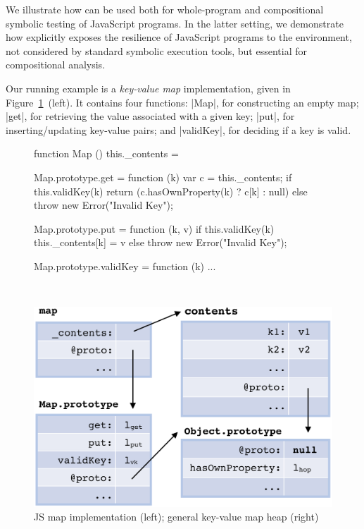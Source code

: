 
We illustrate how \cosette can be used both for whole-program and compositional symbolic testing of JavaScript programs. In the latter setting, we demonstrate how \cosette  explicitly exposes the resilience of JavaScript programs to the environment, not  considered by standard symbolic execution tools, but essential for compositional analysis.

Our running example is a \emph{key-value map} implementation, given in Figure~\ref{map:example}~(left). It contains four functions: 
\jsinline|Map|, for constructing an empty map;
\jsinline|get|, for retrieving the value associated with a given key;
\jsinline|put|, for inserting/updating key-value pairs; and \jsinline|validKey|, for deciding if a key is valid.

 \begin{figure}[h!]
 \vspace*{-0.3cm}
 \begin{minipage}{0.5\textwidth}
 \begin{lstjs}[firstnumber=1]
function Map () { this._contents = {} }

Map.prototype.get = function (k) {
  var c = this._contents;
  if this.validKey(k) {
    return (c.hasOwnProperty(k) ? c[k] : null)
  } else throw new Error("Invalid Key");
}

Map.prototype.put = function (k, v) {
  if this.validKey(k) {  
    this._contents[k] = v   
  } else throw new Error("Invalid Key");
} 

Map.prototype.validKey = function (k) { ... }
\end{lstjs}
\end{minipage}
\ 
 \begin{minipage}{0.45\textwidth}
 \includegraphics[width=1\textwidth]{figures/mapDiagram.png}
 \end{minipage}
 \vspace*{-0.3cm}
\caption{JS map implementation (left); general key-value map heap (right) \label{map:example}}
 \vspace*{-0.3cm}
\end{figure}

